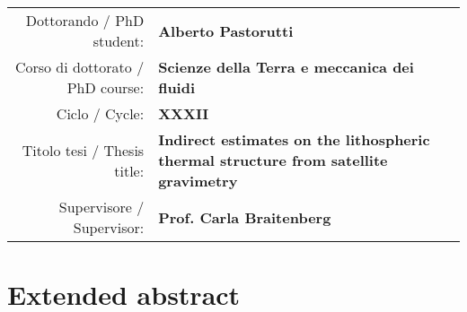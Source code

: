 


\pagestyle{empty}

\begin{adjustbox}{center}
    \begin{tabular}{rp{}}
        \toprule
        Dottorando / PhD student: & \textbf{Alberto Pastorutti} \\
        Corso di dottorato / PhD course: & \textbf{Scienze della Terra e meccanica dei fluidi} \\
        Ciclo / Cycle: & \textbf{XXXII} \\
        Titolo tesi / Thesis title: & \textbf{Indirect estimates on the lithospheric thermal structure from satellite gravimetry} \\
        Supervisore / Supervisor: & \textbf{Prof. Carla Braitenberg} \\
        \bottomrule
    \end{tabular}
\end{adjustbox}


\section*{Extended abstract}





